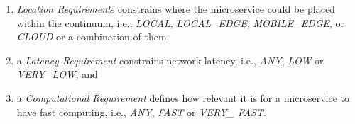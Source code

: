 \begin{enumerate}


	\item \textit{Location Requirement}s constrains where the microservice could be placed within the continuum, i.e., \textit{LOCAL}, \textit{LOCAL\_EDGE}, \textit{MOBILE\_EDGE}, or \textit{CLOUD} or a combination of them; 


	\item a \textit{Latency Requirement} constrains network latency, i.e., \textit{ANY}, \textit{LOW} or \textit{VERY\_LOW}; and 
	

	\item a \textit{Computational Requirement} defines how relevant it is for a microservice to have fast computing, i.e., \textit{ANY}, \textit{FAST} or \textit{VERY\_ FAST}. 


\end{enumerate}



